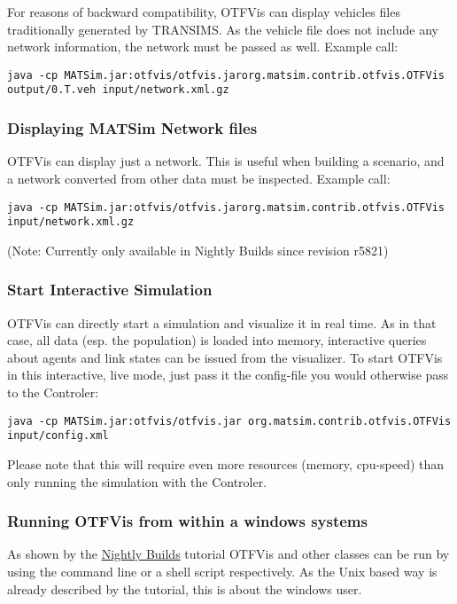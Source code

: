 \documentclass[a4paper,11pt]{report}
\begin{document}
For reasons of backward compatibility, OTFVis can display vehicles  files traditionally generated by TRANSIMS. As the vehicle file does not  include any network information, the network must be passed as well.  Example call:
\begin{verbatim}
java -cp MATSim.jar:otfvis/otfvis.jarorg.matsim.contrib.otfvis.OTFVis output/0.T.veh input/network.xml.gz
\end{verbatim}

\subsubsection{Displaying MATSim Network files}

OTFVis can display just a network. This is useful when building a  scenario, and a network converted from other data must be inspected.  Example call:
\begin{verbatim}
java -cp MATSim.jar:otfvis/otfvis.jarorg.matsim.contrib.otfvis.OTFVis input/network.xml.gz
\end{verbatim}

(Note: Currently only available in Nightly Builds since revision r5821)

\subsubsection{Start Interactive Simulation}

OTFVis can directly start a simulation and visualize it in real time.  As in that case, all data (esp. the population) is loaded into memory,  interactive queries about agents and link states can be issued from the  visualizer. To start OTFVis in this interactive, live mode, just pass it  the config-file you would otherwise pass to the Controler:
\begin{verbatim}
java -cp MATSim.jar:otfvis/otfvis.jar org.matsim.contrib.otfvis.OTFVis input/config.xml
\end{verbatim}

Please note that this will require even more resources (memory, cpu-speed) than only running the simulation with the Controler.

\subsubsection{Running OTFVis from within a windows systems}

As shown by the \href{http://www.matsim.org/downloads/nightly}{Nightly Builds}  tutorial OTFVis and other classes can be run by using the command line  or a shell script respectively. As the Unix based way is already  described by the tutorial, this is about the windows user.
\end{document}
